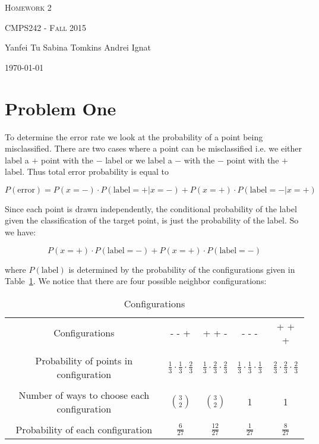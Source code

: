 \documentclass{article}
\begin{document}
\begin{center}
\Huge{\textsc{Homework 2}} 

\Large\textsc{CMPS242 - Fall 2015}

\large{\hfill Yanfei Tu \hfill Sabina Tomkins \hfill Andrei Ignat \hfill}

\normalsize\flushright\today
\end{center}
\vfill

\section{Problem One}
To determine the error rate we look at the probability of a point being misclassified. There are two cases where a point can be misclassified i.e. we either label a $+$ point with the $-$ label or we label a $-$ with the $-$ point with the $+$ label. Thus total error probability is equal to 

\[
P(\text{error})=P(x=-)\cdot P(\text{label} = +| x = -) + P(x=+)\cdot P(\text{label} = -| x=+)
\]

Since each point is drawn independently, the conditional probability of the label given the classification of the target point, is just the probability of the label. So we have:

\[
P(x=+)\cdot P(\text{label} = -) + P(x=+)\cdot P(\text{label} =-)
\]

where $P(\text{label})$ is determined by the probability of the configurations given in Table~\ref{tab:p1confs}. We notice that there are four possible neighbor configurations:\\

\begin{table}[ht]
\centering
\caption{Configurations}\label{tab:p1confs}
\begin{tabular}{|c|c|c|c|c|}\hline
Configurations&- - +  &  + + - & - - - & + + + \\
& & & & \\
Probability of points in configuration &$\frac{1}{3}\cdot \frac{1}{3}\cdot \frac{2}{3}$ &$\frac{1}{3}\cdot \frac{2}{3}\cdot \frac{2}{3}$  & $\frac{1}{3}\cdot \frac{1}{3}\cdot \frac{1}{3}$ &$\frac{2}{3}\cdot \frac{2}{3}\cdot \frac{2}{3}$ \\
& & & & \\
Number of ways to choose each configuration & $\binom{3}{2}$& $\binom{3}{2}$ & 1 & 1 \\
& & & & \\
Probability of each configuration & $\frac{6}{27}$ & $\frac{12}{27}$& $\frac{1}{27}$& $\frac{8}{27}$\\
\hline
\end{tabular}
\end{table}
\end{document}
